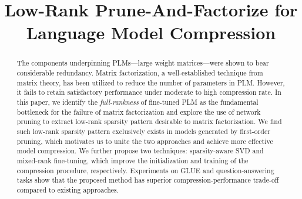 \documentclass[11pt]{article}
\title{Low-Rank Prune-And-Factorize for Language Model Compression}
\begin{document}
	\maketitle
	\begin{abstract}
		The components underpinning PLMs---large weight matrices---were shown to bear considerable redundancy. Matrix factorization, 
		a well-established technique from matrix theory, has been utilized to reduce the number of parameters in PLM. However, it fails to retain satisfactory performance under moderate to high compression rate. In this paper, we identify the \textit{full-rankness} of fine-tuned PLM as the fundamental bottleneck for the failure of matrix factorization and explore the use of network pruning to extract low-rank sparsity pattern desirable to matrix factorization. We find such low-rank sparsity pattern exclusively exists in models generated by first-order pruning, which motivates us to unite the two approaches and achieve more effective model compression.  We further propose two techniques: sparsity-aware SVD and mixed-rank fine-tuning, which improve the initialization and training of the compression procedure, respectively.  Experiments on GLUE and question-answering tasks 
show that the proposed method has superior compression-performance trade-off compared to existing approaches.
	\end{abstract}
	
	
	
	
	
	
	
%	
	
	
	\newpage
	\appendix
	
	\clearpage
%	
\end{document}
